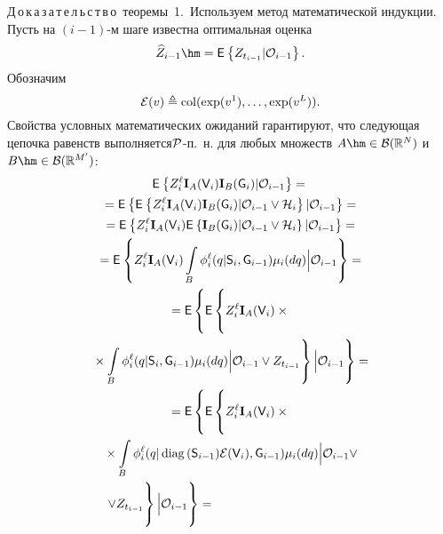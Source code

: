 \begin{multicols}{2}
{\noindent
Д\,о\,к\,а\,з\,а\,т\,е\,л\,ь\,с\,т\,в\,о\ теоремы~1.\
Используем метод математической индукции. Пусть на $(i-1)$-м шаге известна 
оптимальная оценка  
$$
\widehat{Z}_{i-1} \hm= \me{}{Z_{t_{i-1}}|\mathcal{O}_{i-1}}.
$$
Обозначим 
$$
\mathcal{E}(v) \triangleq \mathop{\mathrm{col}}(\exp(v^1),\ldots,\exp(v^L)).
$$
Свойства условных математических ожиданий гарантируют, что следующая цепочка 
равенств выполняется\linebreak ${\mathcal P}$-п.~н. для любых множеств $A \hm\in 
\mathcal{B}(\mathbb{R}^N)$ и~$B \hm\in \mathcal{B}(\mathbb{R}^{M'})$:
\begin{multline*}
\me{}{Z_{i}^{\ell}\mathbf{I}_A(\mathsf{V}_{i})\mathbf{I}_B(\mathsf{G}_{i})|\mathcal{O}_{i-1}} ={}\\
{}=
\me{}{\me{}{Z_{i}^{\ell}\mathbf{I}_A(\mathsf{V}_{i})\mathbf{I}_B(\mathsf{G}_{i})
|\mathcal{O}_{i-1} \vee \mathcal{H}_{i}}
|\mathcal{O}_{i-1}}={}\\
{}=
\me{}{Z_{i}^{\ell}\mathbf{I}_A(\mathsf{V}_{i}) 
\me{}{\mathbf{I}_B(\mathsf{G}_{i})|\mathcal{O}_{i-1} \vee \mathcal{H}_{i}}
|\mathcal{O}_{i-1}}={}\\
{}=
\me{}{Z_{i}^{\ell}\mathbf{I}_A(\mathsf{V}_{i})
\int\limits_B \phi_i^{\ell}(q|\mathsf{S}_{i},\mathsf{G}_{i-
1})\mu_i(dq)\Bigl|\mathcal{O}_{i-1}} ={}
\\
{}=
{\sf E}\left\{ {\sf E}\left\{
\vphantom{\int\limits_B}
Z_{i}^{\ell}\mathbf{I}_A(\mathsf{V}_{i})\times{}\right.\right.\\
\left.\left.{}\times \int\limits_B \phi_i^{\ell}(q|\mathsf{S}_{i},\mathsf{G}_{i-1})\mu_i(dq)\Bigl|\mathcal{O}_{i-1} \vee Z_{t_{i-1}}\right\}\Bigl| \mathcal{O}_{i-1}\right\} = {}\\
{}=
{\sf E}\left\{ {\sf E}\left\{
\vphantom{\int\limits_B}
Z_{i}^{\ell}\mathbf{I}_A(\mathsf{V}_{i})\times{}\right.\right.\\
{}\times\int\limits_B \phi_i^{\ell}(q|\diag(\mathsf{S}_{i-1})\mathcal{E}(\mathsf{V}_{i}),\mathsf{G}_{i-1})\mu_i(dq)\Bigl|\mathcal{O}_{i-1} 
\vee\\
\hspace*{-20mm}\left.\left.\vee Z_{t_{i-1}}
\vphantom{\int\limits_B}
\right\}\Bigl| \mathcal{O}_{i-1}\right\} ={}\hspace*{20mm}
\end{multline*}

}
\end{multicols}
